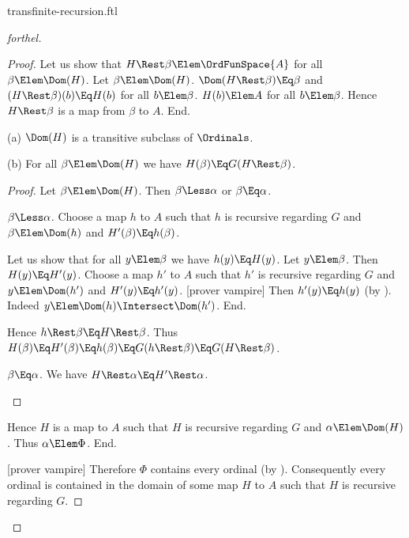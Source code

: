 \documentclass{stex}
\begin{document}
\begin{smodule}{transfinite-recursion.ftl}
\begin{proof}[forthel]
\begin{proof}
      Let us show that $H \Rest \beta \Elem \OrdFunSpace{A}$ for all $\beta \Elem \Dom(H)$.
        Let $\beta \Elem \Dom(H)$.
        $\Dom(H \Rest \beta) \Eq \beta$ and $(H \Rest \beta)(b) \Eq H(b)$ for all $b \Elem \beta$.
        $H(b) \Elem A$ for all $b \Elem \beta$.
        Hence $H \Rest \beta$ is a map from $\beta$ to $A$.
      End.

      (a) $\Dom(H)$ is a transitive subclass of $\Ordinals$.

      (b) For all $\beta \Elem \Dom(H)$ we have $H(\beta) \Eq G(H \Rest \beta)$.
      \begin{proof}
        Let $\beta \Elem \Dom(H)$.
        Then $\beta \Less \alpha$ or $\beta \Eq \alpha$.

        \begin{case}{$\beta \Less \alpha$.}
          Choose a map $h$ to $A$ such that $h$ is recursive regarding $G$ and $\beta \Elem \Dom(h)$ and $H'(\beta) \Eq h(\beta)$.

          Let us show that for all $y \Elem \beta$ we have $h(y) \Eq H(y)$.
            Let $y \Elem \beta$.
            Then $H(y) \Eq H'(y)$.
            Choose a map $h'$ to $A$ such that $h'$ is recursive regarding $G$ and $y \Elem \Dom(h')$ and $H'(y) \Eq h'(y)$.
            [prover vampire]
            Then $h'(y) \Eq h(y)$ (by ).
            Indeed $y \Elem \Dom(h) \Intersect \Dom(h')$.
          End.

          Hence $h \Rest \beta \Eq H \Rest \beta$.
          Thus $H(\beta)
            \Eq H'(\beta)
            \Eq h(\beta)
            \Eq G(h \Rest \beta)
            \Eq G(H \Rest \beta)$.
        \end{case}

        \begin{case}{$\beta \Eq \alpha$.}
          We have $H \Rest \alpha \Eq H' \Rest \alpha$.
        \end{case}
      \end{proof}

      Hence $H$ is a map to $A$ such that $H$ is recursive regarding $G$ and $\alpha \Elem \Dom(H)$.
      Thus $\alpha \Elem \Phi$.
    End.

    [prover vampire]
    Therefore $\Phi$ contains every ordinal (by ).
    Consequently every ordinal is contained in the domain of some map $H$ to $A$ such that $H$ is recursive regarding $G$.
  \end{proof}


\end{proof}
\end{smodule}
\end{document}
